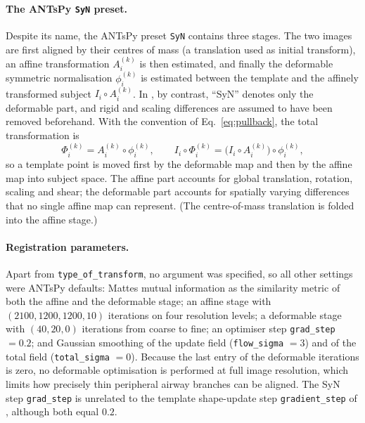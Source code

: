 \paragraph{The ANTsPy \texttt{SyN} preset.}  %
Despite its name, the ANTsPy preset \texttt{SyN} contains three stages. The two
images are first aligned by their centres of mass (a translation used as initial
transform), an affine transformation $A_i^{(k)}$ is then estimated, and finally
the deformable symmetric normalisation $\phi_i^{(k)}$ is estimated between the
template and the affinely transformed subject $I_i\circ A_i^{(k)}$. In
\citet{avants2008syn}, by contrast, ``SyN'' denotes only the deformable part, and
rigid and scaling differences are assumed to have been removed beforehand. With
the convention of Eq.~\eqref{eq:pullback}, the total transformation is
\begin{equation}
  \Phi_i^{(k)} = A_i^{(k)} \circ \phi_i^{(k)},
  \qquad
  I_i\circ\Phi_i^{(k)} = \big(I_i\circ A_i^{(k)}\big)\circ\phi_i^{(k)},
  \label{eq:affine_plus_syn}     %
\end{equation}
so a template point is moved first by the deformable map and then by the affine
map into subject space. The affine part accounts for global translation,
rotation, scaling and shear; the deformable part accounts for spatially varying
differences that no single affine map can represent. (The centre-of-mass
translation is folded into the affine stage.)

\paragraph{Registration parameters.}  %
Apart from \texttt{type\_of\_transform}, no argument was specified, so all
other settings were ANTsPy defaults: Mattes mutual information as the similarity metric of both the
affine and the deformable stage; an affine stage with
$(2100,1200,1200,10)$ iterations on four resolution levels; a deformable stage
with $(40,20,0)$ iterations from coarse to fine; an optimiser step
\texttt{grad\_step} $=0.2$; and Gaussian smoothing of the update field
(\texttt{flow\_sigma} $=3$) and of the total field (\texttt{total\_sigma} $=0$).
Because the last entry of the deformable iterations is zero, no deformable
optimisation is performed at full image resolution, which limits how precisely
thin peripheral airway branches can be aligned. The SyN step \texttt{grad\_step}
is unrelated to the template shape-update step \texttt{gradient\_step} of
, although both equal $0.2$.

